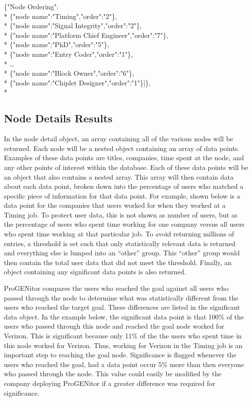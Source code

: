 \begin{tt}
\begin{footnotesize}
\noindent \{"Node Ordering":\\*
	\indent\{"node	name":"Timing","order":"2"\},\\*
	\indent\{"node name":"Signal Integrity","order":"2"\},\\*
	\indent\{"node name":"Platform Chief Engineer","order":"7"\},\\*
	\indent\{"node name":"PhD","order":"5"\},\\*
	\indent\{"node name":"Entry Coder","order":"1"\},\\*
	\indent\ldots\\*
	\indent\{"node name":"Block Owner","order":"6"\},\\*
	\indent\{"node name":"Chiplet Designer","order":"1"\}]\},\\*
\end{footnotesize}
\end{tt}

\subsection{Node Details Results}
In the node detail object, an array containing all of the various nodes
will be returned.  Each node will be a nested object containing an array of data
points.  Examples of these data points are titles, companies, time spent at the
node, and any other points of interest within the database.  Each of these data
points will be an object that also contains a nested array.  This array
will then contain data about each data point, broken down into the percentage of
users who matched a specific piece of information for that data point.  For
example, shown below is a data point for the companies that users worked for
when they worked at a Timing job.  To protect user data, this is not shown as
number of users, but as the percentage of users who spent time working for one
company versus all users who spent time working at that particular job.  To
avoid returning millions of entries, a threshold is set such that only
statistically relevant data is returned and everything else is lumped into an
``other'' group.  This ``other'' group would then contain the total user data
that did not meet the threshold.  Finally, an object containing any significant data
points is also returned.

ProGENitor compares the users who reached the goal against all users who passed
through the node to determine what was statistically different from the users
who reached the target goal.  These differences are listed in the significant
data object. In the example below, the significant data point is that 100\% of
the users who passed through this node and reached the goal node worked for
Verizon.  This is significant because only 11\% of the the users who spent time
in this node worked for Verizon.  Thus, working for Verizon in the Timing job is
an important step to reaching the goal node.  Significance is flagged whenever
the users who reached the goal, had a data point occur 5\% more than then
everyone who passed through the node.  This value could easily be modified by
the company deploying ProGENitor if a greater difference was required for significance.

